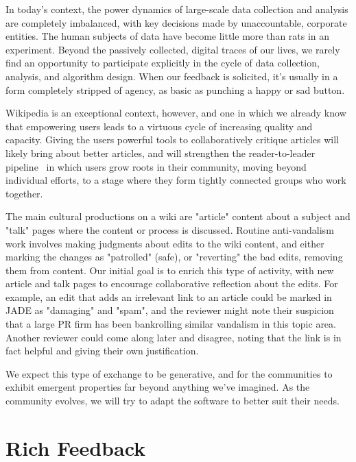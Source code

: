 \documentclass[sigconf, anonymous, review]{acmart}
\begin{document}
In today's context, the power dynamics of large-scale data collection and analysis are completely imbalanced, with key decisions made by unaccountable, corporate entities.  The human subjects of data have become little more than rats in an experiment.  Beyond the passively collected, digital traces of our lives, we rarely find an opportunity to participate explicitly in the cycle of data collection, analysis, and algorithm design.  When our feedback is solicited, it's usually in a form completely stripped of agency, as basic as punching a happy or sad button.\cite{levaniemi2012indicator}

Wikipedia is an exceptional context, however, and one in which we already know that empowering users leads to a virtuous cycle of increasing quality and capacity.  Giving the users powerful tools to collaboratively critique articles will likely bring about better articles, and will strengthen the reader-to-leader pipeline~\cite{preece2009reader} in which users grow roots in their community, moving beyond individual efforts, to a stage where they form tightly connected groups who work together.

The main cultural productions on a wiki are "article" content about a subject and "talk" pages where the content or process is discussed.  Routine anti-vandalism work involves making judgments about edits to the wiki content, and either marking the changes as "patrolled" (safe), or "reverting" the bad edits, removing them from content.  Our initial goal is to enrich this type of activity, with new article and talk pages to encourage collaborative reflection about the edits.  For example, an edit that adds an irrelevant link to an article could be marked in JADE as "damaging" and "spam", and the reviewer might note their suspicion that a large PR firm has been bankrolling similar vandalism in this topic area.  Another reviewer could come along later and disagree, noting that the link is in fact helpful and giving their own justification.

We expect this type of exchange to be generative, and for the communities to exhibit emergent properties far beyond anything we've imagined.  As the community evolves, we will try to adapt the software to better suit their needs.

\section{Rich Feedback}
\end{document}
